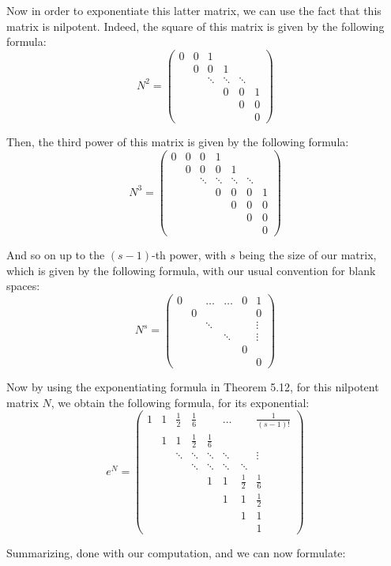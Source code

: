 \documentclass[12pt]{amsbook}
\begin{document}
Now in order to exponentiate this latter matrix, we can use the fact that this matrix is nilpotent. Indeed, the square of this matrix is given by the following formula: 
$$N^2=\begin{pmatrix}
0&0&1\\
&0&0&1\\
&&\ddots&\ddots&\ddots\\
&&&0&0&1\\
&&&&0&0\\
&&&&&0
\end{pmatrix}$$

Then, the third power of this matrix is given by the following formula:
$$N^3=\begin{pmatrix}
0&0&0&1\\
&0&0&0&1\\
&&\ddots&\ddots&\ddots&\ddots\\
&&&0&0&0&1\\
&&&&0&0&0\\
&&&&&0&0\\
&&&&&&0
\end{pmatrix}$$

And so on up to the $(s-1)$-th power, with $s$ being the size of our matrix, which is given by the following formula, with our usual convention for blank spaces:
$$N^s=\begin{pmatrix}
0&&\ldots&\ldots&0&1\\
&0&&&&0\\
&&\ddots&&&\vdots\\
&&&\ddots&&\vdots\\
&&&&0&\\
&&&&&0
\end{pmatrix}$$

Now by using the exponentiating formula in Theorem 5.12, for this nilpotent matrix $N$, we obtain the following formula, for its exponential:
$$e^N=\begin{pmatrix}
1&1&\frac{1}{2}&\frac{1}{6}&&\ldots&&\frac{1}{(s-1)!}\\
&1&1&\frac{1}{2}&\frac{1}{6}\\
&&\ddots&\ddots&\ddots&\ddots&&\vdots\\
&&&\ddots&\ddots&\ddots&\ddots\\
&&&&1&1&\frac{1}{2}&\frac{1}{6}\\
&&&&&1&1&\frac{1}{2}\\
&&&&&&1&1\\
&&&&&&&1
\end{pmatrix}$$

Summarizing, done with our computation, and we can now formulate:
\end{document}
